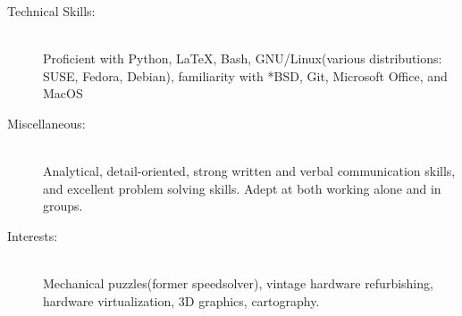 \documentclass[letterpaper, 10pt]{article}
\begin{document}
\begin{description}
    \item[Technical Skills:] 
        \ \\Proficient with Python, \LaTeX, Bash, GNU/Linux(various distributions: SUSE, Fedora, Debian), familiarity with *BSD, Git, Microsoft Office, and MacOS
    \item[Miscellaneous:]
        \ \\ Analytical, detail-oriented, strong written and verbal communication skills, and excellent problem solving skills. Adept at both working alone and in groups. 
    \item[Interests:]
        \ \\Mechanical puzzles(former speedsolver), vintage hardware refurbishing, hardware virtualization, 3D graphics, cartography.
\end{description}
\end{document}

